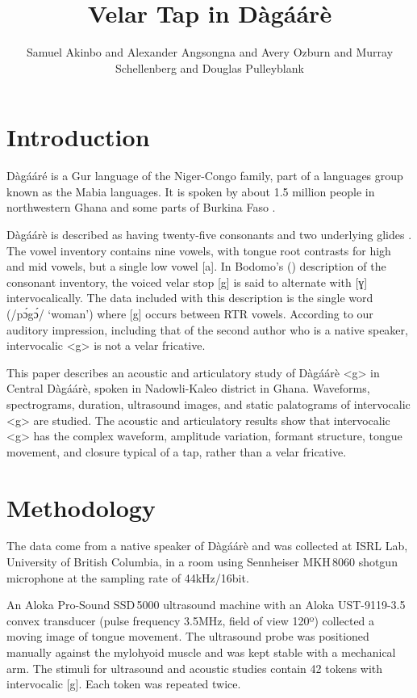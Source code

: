 \documentclass[output=paper, modfonts]{langscibook}
\title{Velar Tap in Dàgáárè}
\author{Samuel Akinbo\affiliation{University of British Columbia} and  Alexander Angsongna\affiliation{University of British Columbia} and Avery Ozburn\affiliation{University of British Columbia} and Murray Schellenberg\affiliation{University of British Columbia} and Douglas Pulleyblank\affiliation{University of British Columbia}}
\begin{document}
\graphicspath{{figures/}}
\maketitle

\section{Introduction} 
D\`ag\'a\'ar\'e is a Gur language of the Niger-Congo family, part of a languages group known as the Mabia languages. It is spoken by about 1.5 million people in northwestern Ghana and some parts of Burkina Faso \citep{kennedy1966collected, bodomo1997}.

Dàgáárè is described as having twenty-five consonants and two underlying glides \citep{bodomo1997}. The vowel inventory contains nine vowels, with tongue root contrasts for high and mid vowels, but a single low vowel [a]. In Bodomo's (\citeyear{bodomo1997}) description of the consonant inventory, the voiced velar stop [g] is said to alternate with [ɣ] intervocalically. The data included with this description is the single word (/p\'ɔg\'ɔ/ ‘woman’) where [g] occurs between RTR vowels. According to our auditory impression, including that of the second author who is a native speaker, intervocalic <g> is not a velar fricative.

This paper describes an acoustic and articulatory study of Dàgáárè <g> in Central Dàgáárè, spoken in Nadowli-Kaleo district in Ghana. Waveforms, spectrograms, duration, ultrasound images, and static palatograms of intervocalic <g> are studied. The acoustic and articulatory results show that intervocalic <g> has the complex waveform, amplitude variation, formant structure, tongue movement, and closure typical of a tap, rather than a velar fricative.
 

\section{Methodology}
The data come from a native speaker of Dàgáárè and was collected at ISRL Lab, University of British Columbia, in a room using Sennheiser MKH\,8060 shotgun microphone at the sampling rate of 44kHz/16bit.

An Aloka Pro-Sound SSD\,5000 ultrasound machine with an Aloka UST-9119-3.5 convex transducer (pulse frequency 3.5MHz, field of view 120º) collected a moving image of tongue movement. The ultrasound probe was positioned manually against the mylohyoid muscle and was kept stable with a mechanical arm. The stimuli for ultrasound and acoustic studies contain 42 tokens with intervocalic [g]. Each token was repeated twice.
\end{document}
